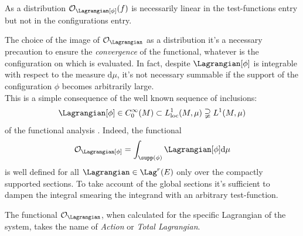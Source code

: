 \documentclass[Main]{subfiles}
\begin{document}
	\begin{proposition}
		As a distribution $\mathcal{O}_\Lagrangian [\phi] (f) $ is necessarily linear in the test-functions entry but not in the configurations entry.	
	\end{proposition}	
	
	\begin{observation}
		The choice of the image of $\mathcal{O}_\Lagrangian$ as a distribution it's a necessary precaution to ensure the \emph{convergence} of the functional, whatever is the configuration on which is evaluated.
		In fact, despite $\Lagrangian [ \phi ]$ is integrable with respect to the measure $\textrm{d}\mu$, it's not necessary summable if the support of the configuration $\phi$ becomes arbitrarily large.
		\\
		This is a simple consequence of the well known sequence of inclusions:
		\begin{displaymath}
			\Lagrangian [ \phi ] \in C^\infty_0(M) \subset L^1_{\textrm{loc}}(M,\mu) \supsetneqq  L^1(M,\mu) 
		\end{displaymath}
		of the functional analysis .
		Indeed, the functional
		\begin{displaymath}
			\mathcal{O}_\Lagrangian [\phi]= \int_{\supp(\phi)} \Lagrangian [\phi] \textrm{d}\mu
		\end{displaymath}
		is well defined for all $\Lagrangian \in \Lag^r(E)$ only over the compactly supported sections. 
		To take account of the global sections it's sufficient to dampen the integral smearing the integrand with an arbitrary test-function.
	\end{observation}
	
	\begin{notationfix}
		The functional $\mathcal{O}_\Lagrangian$, when calculated for the specific Lagrangian of the system, takes the name of \emph{Action} or \emph{Total Lagrangian}. 
	\end{notationfix}
\end{document}
